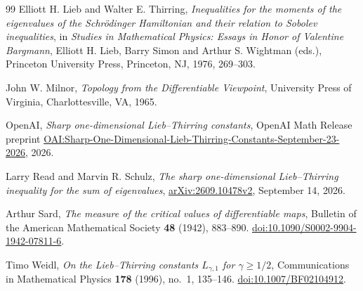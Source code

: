 \begin{thebibliography}{99}
Elliott H. Lieb and Walter E. Thirring,
\emph{Inequalities for the moments of the eigenvalues of the Schr\"odinger
Hamiltonian and their relation to Sobolev inequalities},
in \emph{Studies in Mathematical Physics: Essays in Honor of Valentine
Bargmann}, Elliott H. Lieb, Barry Simon and Arthur S. Wightman (eds.),
Princeton University Press, Princeton, NJ, 1976, 269--303.

John W. Milnor,
\emph{Topology from the Differentiable Viewpoint},
University Press of Virginia, Charlottesville, VA, 1965.

OpenAI,
\emph{Sharp one-dimensional Lieb--Thirring constants},
OpenAI Math Release preprint
\href{https://github.com/openai/math/blob/main/preprints/Sharp-One-Dimensional-Lieb-Thirring-Constants-September-23-2026/paper.pdf}{OAI:Sharp-One-Dimensional-Lieb-Thirring-Constants-September-23-2026},
2026.

Larry Read and Marvin R. Schulz,
\emph{The sharp one-dimensional Lieb--Thirring inequality for the sum
of eigenvalues},
\href{https://arxiv.org/abs/2609.10478v2}{arXiv:2609.10478v2},
September 14, 2026.

Arthur Sard,
\emph{The measure of the critical values of differentiable maps},
Bulletin of the American Mathematical Society \textbf{48} (1942),
883--890.
\href{https://doi.org/10.1090/S0002-9904-1942-07811-6}{doi:10.1090/S0002-9904-1942-07811-6}.

Timo Weidl,
\emph{On the Lieb--Thirring constants $L_{\gamma,1}$ for $\gamma\ge1/2$},
Communications in Mathematical Physics \textbf{178} (1996), no.~1, 135--146.
\href{https://doi.org/10.1007/BF02104912}{doi:10.1007/BF02104912}.

\end{thebibliography}
